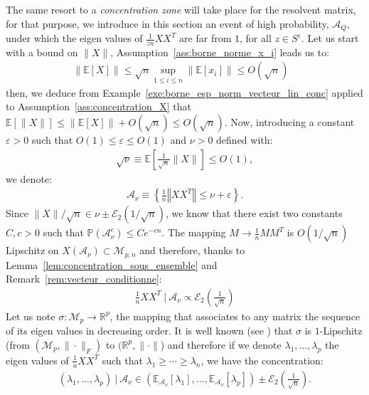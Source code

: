 \documentclass[a4papaer, titlepage]{book}
\begin{document}
  The same resort to a \textit{concentration zone} will take place for the resolvent matrix, for that purpose, we introduce in this section an event of high probability, $\mathcal A_Q$, under which the eigen values of $\frac1{zn} XX^T$ are far from $1$, for all $z \in S^\varepsilon$.
Let us start with a bound on $\|X\|$, Assumption~\ref{ass:borne_norme_x_i} leads us to:
\begin{align*}
  \|\mathbb E[X] \| \leq \sqrt n \sup_{1\leq i\leq n}\|\mathbb E[x_i]\| \leq O(\sqrt n)&
\end{align*}
then, we deduce from Example~\ref{exe:borne_esp_norm_vecteur_lin_conc} applied to Assumption~\ref{ass:concentration_X} that $\mathbb E[\|X\|] \leq \|\mathbb E[X] \| + O(\sqrt n) \leq O(\sqrt n)$.
Now, introducing a constant $\varepsilon>0$ such that $O(1) \leq \varepsilon \leq O(1)$ and $\nu >0$ defined with:
\begin{align*}
   \sqrt \nu \equiv \mathbb E \left[\frac{1}{ \sqrt n}\|X\|\right]\leq O(1),
 \end{align*} 
 we denote:
  \begin{align}\label{eq:definition_A_Q_epsilon}
  \mathcal A_\nu \equiv \left\{\frac{1}{n}\left\Vert XX^T\right\Vert \leq  \nu +\varepsilon\right\}.
  \end{align}
Since $\|X\|/\sqrt n \in \nu \pm \mathcal E_2(1/\sqrt n)$, we know that there exist two constants $C,c>0$ such that $\mathbb P \left( \mathcal A_\nu^c \right)\leq C e^{-cn}$. %
The mapping $M \to \frac{1}{n} MM^T$ is $O(1/\sqrt n)$ Lipschitz on $X(\mathcal A_\nu) \subset \mathcal M_{p,n}$ and therefore, thanks to Lemma~\ref{lem:concentration_sous_ensemble} and Remark~\ref{rem:vecteur_conditionne}: 
\begin{align*}
  \frac{1}{n}XX^T \ | \ \mathcal A_\nu \propto \mathcal E_2 \left(\frac{1}{\sqrt n}\right)
\end{align*}
Let us note $\sigma : \mathcal M_{p} \to \mathbb R^p$, the mapping that associates to any matrix the sequence of its eigen values in decreasing order. It is well known (see \cite[Theorem 8.1.15]{Gol96}) that $\sigma$ is $1$-Lipschitz (from $(\mathcal M_{p}, \|\cdot \|_
F)$ to $(\mathbb R^p , \|\cdot\|$) and therefore if we denote $\lambda_1,\ldots, \lambda_p$ the eigen values of $\frac{1}{n}XX^T$ such that $\lambda_1\geq \cdots\geq \lambda_n$, we have the concentration:
\begin{align*}
  (\lambda_1,\ldots, \lambda_p) \ | \ \mathcal A_\nu \in \left(\mathbb E_{\mathcal A_\nu}[\lambda_1],\ldots, \mathbb E_{\mathcal A_\nu}[\lambda_p]\right) \pm \mathcal E_2 \left(\frac{1}{\sqrt n}\right).
\end{align*}
\end{document}
